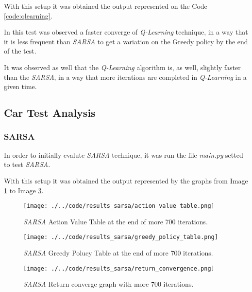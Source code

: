 \documentclass[journal]{IEEEtran}
\begin{document}
With this setup it was obtained the output represented on the Code \ref{code:qlearning}.



In this test was observed a faster converge of \textit{Q-Learning} technique, in a way that it is less frequent than \textit{SARSA} to get a variation on the Greedy policy by the end of the test.

It was observed as well that the \textit{Q-Learning} algorithm is, as well, slightly faster than the \textit{SARSA}, in a way that more iterations are completed in \textit{Q-Learning} in a given time.

\subsection{Car Test Analysis}

\subsubsection{SARSA}
In order to initially evalute \textit{SARSA} technique, it was run the file \textit{main.py} setted to test \textit{SARSA}.

With this setup it was obtained the output represented by the graphs from Image \ref{img:sarsa_action} to Image \ref{img:sarsa_convergence}.

\begin{figure}
  \begin{center}
  \texttt{[image: ./../code/results\_sarsa/action\_value\_table.png]}
  \caption{\textit{SARSA} Action Value Table at the end of more 700 iterations.}
  \label{img:sarsa_action}
  \end{center}
\end{figure}

\begin{figure}
  \begin{center}
  \texttt{[image: ./../code/results\_sarsa/greedy\_policy\_table.png]}
  \caption{\textit{SARSA} Greedy Polucy Table at the end of more 700 iterations.}
  \label{img:sarsa_greedy}
  \end{center}
\end{figure}

\begin{figure}
  \begin{center}
  \texttt{[image: ./../code/results\_sarsa/return\_convergence.png]}
  \caption{\textit{SARSA} Return converge graph with more 700 iterations.}
  \label{img:sarsa_convergence}
  \end{center}
\end{figure}
\end{document}
